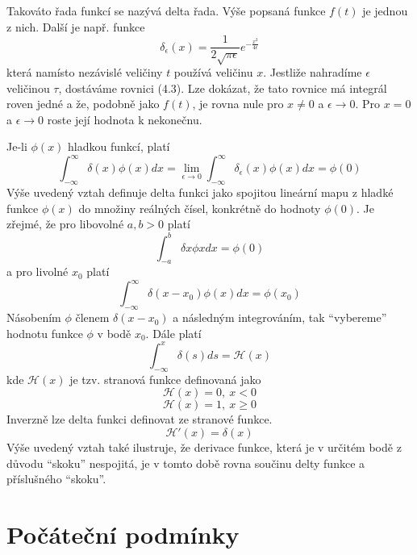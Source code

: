 \documentclass[a4paper]{book}
\begin{document}
Takováto řada funkcí se nazývá delta řada. Výše popsaná funkce $f(t)$ je jednou z nich. Další je např. funkce
\begin{equation*}
\delta_{\epsilon}(x) = \frac{1}{2 \sqrt{\pi \epsilon}}e^{-\frac{x^2}{4 \epsilon}}
\end{equation*}
která namísto nezávislé veličiny $t$ používá veličinu $x$. Jestliže nahradíme $\epsilon$ veličinou $\tau$, dostáváme rovnici (4.3). Lze dokázat, že tato rovnice má integrál roven jedné a že, podobně jako $f(t)$, je rovna nule pro $x \neq 0$ a $\epsilon \rightarrow 0$. Pro $x = 0$ a $\epsilon \rightarrow 0$ roste její hodnota k nekonečnu.

Je-li $\phi(x)$ hladkou funkcí, platí
\begin{equation*}
\int^{\infty}_{-\infty}\delta(x)\phi(x)dx = \underset{\epsilon \rightarrow 0}\lim \int^{\infty}_{-\infty} \delta_{\epsilon}(x)\phi(x)dx = \phi(0)
\end{equation*}
Výše uvedený vztah definuje delta funkci jako spojitou lineární mapu z hladké funkce $\phi(x)$ do množiny reálných čísel, konkrétně do hodnoty $\phi(0)$. Je zřejmé, že pro libovolné $a,b > 0$ platí
\begin{equation*}
\int^b_{-a} \delta{x}\phi{x}dx = \phi(0)
\end{equation*}
a pro livolné $x_0$ platí
\begin{equation*}
\int^{\infty}_{-\infty}\delta(x - x_0)\phi(x)dx = \phi(x_0)
\end{equation*}
Násobením $\phi$ členem $\delta(x - x_0)$ a následným integrováním, tak ``vybereme'' hodnotu funkce $\phi$ v bodě $x_0$. Dále platí
\begin{equation*}
\int^x_{-\infty}\delta(s)ds = \mathcal{H}(x)
\end{equation*}
kde $\mathcal{H}(x)$ je tzv. stranová funkce definovaná jako
\begin{equation*}
\mathcal{H}(x) = 0,~x < 0
\end{equation*}
\begin{equation*}
\mathcal{H}(x) = 1,~x \ge 0
\end{equation*}
Inverzně lze delta funkci definovat ze stranové funkce.
\begin{equation*}
\mathcal{H}'(x) = \delta(x)
\end{equation*}
Výše uvedený vztah také ilustruje, že derivace funkce, která je v určitém bodě z důvodu ``skoku'' nespojitá, je v tomto době rovna součinu delty funkce a příslušného ``skoku''.

\section{Počáteční podmínky}
\end{document}
